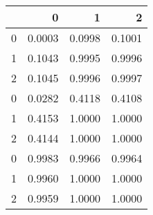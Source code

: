 \begin{tabular}{lrrr}
\toprule
{} &       0 &       1 &       2 \\
\midrule
0 &  0.0003 &  0.0998 &  0.1001 \\
1 &  0.1043 &  0.9995 &  0.9996 \\
2 &  0.1045 &  0.9996 &  0.9997 \\
0 &  0.0282 &  0.4118 &  0.4108 \\
1 &  0.4153 &  1.0000 &  1.0000 \\
2 &  0.4144 &  1.0000 &  1.0000 \\
0 &  0.9983 &  0.9966 &  0.9964 \\
1 &  0.9960 &  1.0000 &  1.0000 \\
2 &  0.9959 &  1.0000 &  1.0000 \\
\bottomrule
\end{tabular}
